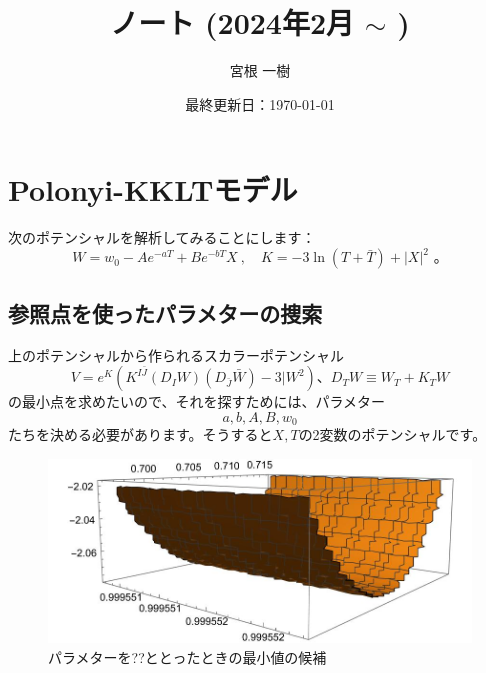 \documentclass[unicode,a4paper,11pt]{ltjsarticle}
\title{ノート (2024年2月 $\sim$ )}
\author{宮根 一樹}
\date{最終更新日：\today}
\theoremstyle{definition}
\begin{document}
\maketitle

\tableofcontents

\clearpage

\section{Polonyi-KKLTモデル}

次のポテンシャルを解析してみることにします：
\begin{equation}
  W
  =
  w_{0}
  -
  Ae^{-aT}
  +
  Be^{-bT}X
  \ ,\quad
  K
  =
  -3\ln(T+\bar{T})
  +
  |X|^2
  \text{\ 。}
\end{equation}



\subsection{参照点を使ったパラメターの捜索}

上のポテンシャルから作られるスカラーポテンシャル
\begin{equation}
  V
  =
  e^{K}
  \left(  
    K^{I\bar{J}}(D_{I}W)(D_{\bar{J}}\bar{W})-3|W^2
  \right)
  \text{、}
  D_{T}W
  \equiv
  W_{T}
  +
  K_{T}W
\end{equation}
の最小点を求めたいので、それを探すためには、パラメター
\begin{equation}
  a,b,A,B,w_{0}
\end{equation}
たちを決める必要があります。そうすると$X,T$の2変数のポテンシャルです。

\begin{figure}
  \centering
  \includegraphics[width=0.8\linewidth]{fig/20240318.jpg}
  \caption{パラメターを??ととったときの最小値の候補}
  \label{fig:20240318}
\end{figure}















\clearpage



\nocite{Abe:2006xp}
\nocite{Abe:2007yb}
\nocite{Abe:2012ya}
\end{document}
